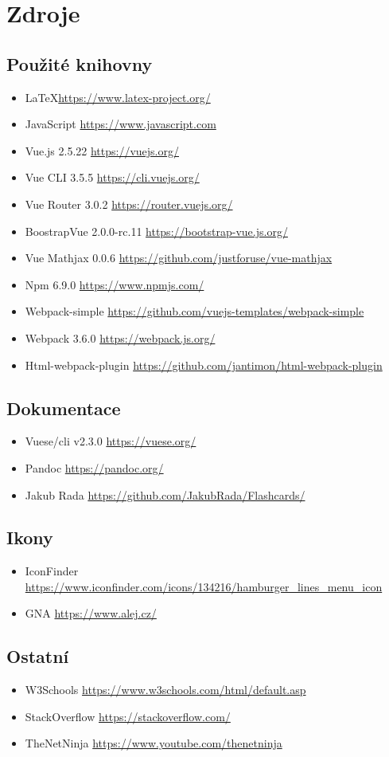 \section{Zdroje}

\subsection{Použité knihovny}

\begin{itemize}
\tightlist
\item \LaTeX \url{https://www.latex-project.org/}
\item JavaScript \url{https://www.javascript.com}
\item Vue.js 2.5.22 \url{https://vuejs.org/}
\item Vue CLI 3.5.5 \url{https://cli.vuejs.org/}
\item Vue Router 3.0.2 \url{https://router.vuejs.org/}
\item BoostrapVue 2.0.0-rc.11 \url{https://bootstrap-vue.js.org/}
\item Vue Mathjax 0.0.6 \url{https://github.com/justforuse/vue-mathjax}
\item Npm 6.9.0 \url{https://www.npmjs.com/}
\item Webpack-simple \url{https://github.com/vuejs-templates/webpack-simple}
\item Webpack 3.6.0 \url{https://webpack.js.org/}
\item Html-webpack-plugin \url{https://github.com/jantimon/html-webpack-plugin}
\end{itemize}

\subsection{Dokumentace}

\begin{itemize}
\tightlist
\item Vuese/cli v2.3.0 \url{https://vuese.org/}
\item Pandoc \url{https://pandoc.org/}
\item Jakub Rada \url{https://github.com/JakubRada/Flashcards/}
\end{itemize}

\subsection{Ikony}

\begin{itemize}
\tightlist
\item IconFinder \url{https://www.iconfinder.com/icons/134216/hamburger_lines_menu_icon}
\item GNA \url{https://www.alej.cz/}
\end{itemize}

\subsection{Ostatní}

\begin{itemize}
\tightlist
\item W3Schools \url{https://www.w3schools.com/html/default.asp}
\item StackOverflow \url{https://stackoverflow.com/}
\item TheNetNinja \url{https://www.youtube.com/thenetninja}
\end{itemize}
